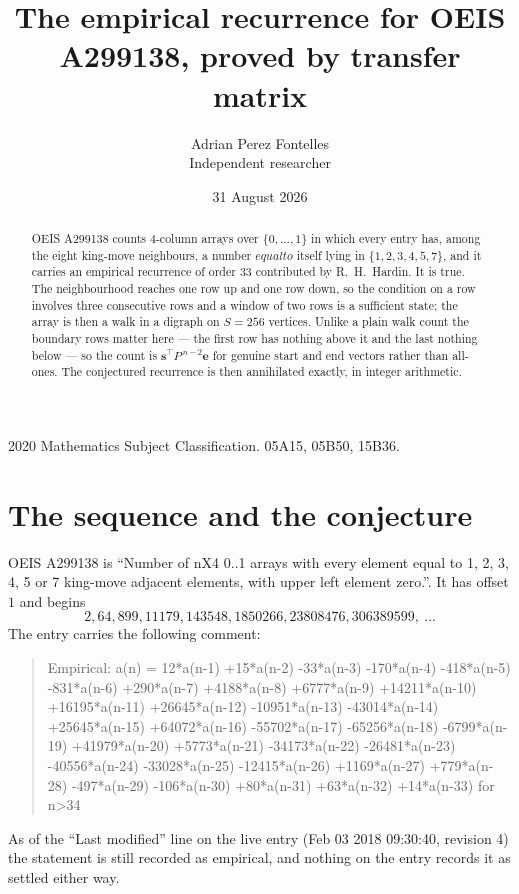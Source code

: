 \documentclass[11pt,a4paper]{article}
\title{The empirical recurrence for OEIS A299138, proved by transfer matrix}
\author{Adrian Perez Fontelles\\ \small Independent researcher}
\date{31 August 2026}
\theoremstyle{plain}
\theoremstyle{definition}
\begin{document}
\maketitle

\begin{abstract}
OEIS A299138 counts $4$-column arrays over $\{0,\dots,1\}$ in which every entry has,
among the eight king-move neighbours, a number $equal to$ itself lying in $\{1,2,3,4,5,7\}$, and it carries an empirical
recurrence of order $33$ contributed by R.~H.~Hardin. It is true. The neighbourhood
reaches one row up and one row down, so the condition on a row involves three consecutive
rows and a window of two rows is a sufficient state; the array is then a walk in a digraph
on $S=256$ vertices. Unlike a plain walk count the boundary rows matter here --- the first
row has nothing above it and the last nothing below --- so the count is
$\mathbf{s}^{\!\top}P^{\,n-2}\mathbf{e}$ for genuine start and end vectors rather than
all-ones. The conjectured recurrence is then annihilated exactly, in integer arithmetic.
\end{abstract}

\noindent\small 2020 Mathematics Subject Classification. 05A15, 05B50, 15B36.\normalsize

\section{The sequence and the conjecture}

OEIS A299138 is ``Number of nX4 0..1 arrays with every element equal to 1, 2, 3, 4, 5 or 7 king-move adjacent elements, with upper left element zero.''. It has offset
$1$ and begins
\[
2, 64, 899, 11179, 143548, 1850266, 23808476, 306389599,\ \dots
\]
The entry carries the following comment:
\begin{quote}\small
Empirical: a(n) = 12*a(n-1) +15*a(n-2) -33*a(n-3) -170*a(n-4) -418*a(n-5) -831*a(n-6) +290*a(n-7) +4188*a(n-8) +6777*a(n-9) +14211*a(n-10) +16195*a(n-11) +26645*a(n-12) -10951*a(n-13) -43014*a(n-14) +25645*a(n-15) +64072*a(n-16) -55702*a(n-17) -65256*a(n-18) -6799*a(n-19) +41979*a(n-20) +5773*a(n-21) -34173*a(n-22) -26481*a(n-23) -40556*a(n-24) -33028*a(n-25) -12415*a(n-26) +1169*a(n-27) +779*a(n-28) -497*a(n-29) -106*a(n-30) +80*a(n-31) +63*a(n-32) +14*a(n-33) for n>34
\end{quote}
As of the ``Last modified'' line on the live entry (Feb 03 2018 09:30:40, revision
4) the statement is still recorded as empirical, and nothing on the entry
records it as settled either way.
\end{document}

